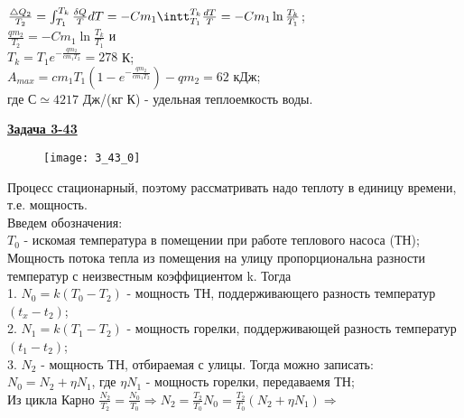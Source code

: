 \documentclass[12pt]{article}
\begin{document}
{{$\frac{\triangle Q_2}{T_2}=\int_{T_1}^{T_k}\frac{\delta Q}{T}dT=-Cm_1\intt_{T_1}^{T_k}\frac{dT}{T}=-Cm_1\ln\frac{T_k}{T_1}$;\\

$\frac{qm_2}{T_2}=-Cm_1\ln\frac{T_k}{T_1}$ и \\

$T_k=T_1e^{-\frac{qm_2}{cm_1T_2}}=278$ К;\\

$A_{max}=cm_1T_1(1-e^{-\frac{qm_2}{cm_1T_2}})-qm_2=62$ кДж;\\

где $С\simeq4217$  Дж/(кг К) - удельная теплоемкость воды.




\newpage


{\underline\bf Задача 3-43}

\begin{figure}[h]
\texttt{[image: 3\_43\_0]}
\end{figure}

\vspace{0.5cm}

Процесс стационарный, поэтому рассматривать надо теплоту в единицу времени, т.е. мощность.\\

Введем обозначения:\\

$T_0$ - искомая температура в помещении при работе теплового насоса (ТН);\\

Мощность потока тепла из помещения на улицу пропорциональна разности температур с неизвестным коэффициентом k. Тогда \\

1. $N_0=k(T_0-T_2)$ - мощность ТН, поддерживающего разность температур $(t_x-t_2)$;\\

2. $N_1=k(T_1-T_2)$ - мощность горелки, поддерживающей разность температур $(t_1-t_2)$;\\

3. $N_2$ - мощность ТН, отбираемая с улицы. Тогда можно записать:\\

$N_0=N_2+\eta N_1$, где $\eta N_1$ - мощность горелки, передаваемя ТН;\\

Из цикла Карно $\frac{N_2}{T_2}=\frac{N_0}{T_0} \Rightarrow N_2=\frac{T_2}{T_0}N_0=\frac{T_2}{T_0}(N_2+\eta N_1)\Rightarrow$\\

}}
\end{document}
